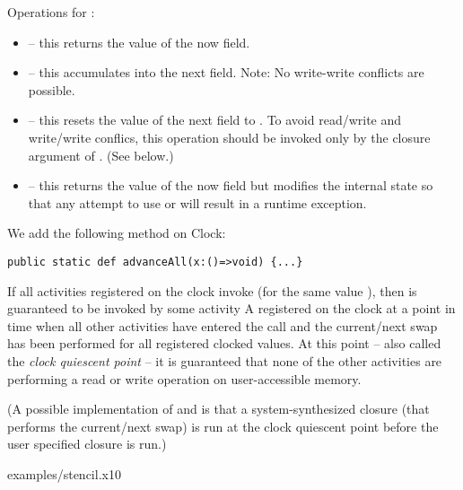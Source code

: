Operations for :
\begin{itemize}
\item {} -- this returns the value of the now field.
\item{} -- this accumulates  into the next field. Note: No
     write-write conflicts are possible.
\item{} -- this resets the value of the next field to . To avoid
     read/write and write/write conflics, this operation should be
     invoked only by the closure argument of
     . (See below.)
\item {} -- this returns the value of the now field but
     modifies the internal state so that any attempt to use  
     or  will result in a runtime exception.
\end{itemize}

We add the following method on Clock:
\begin{lstlisting}
public static def advanceAll(x:()=>void) {...}
\end{lstlisting}

If all activities registered on the clock invoke 
(for the same value ), then  is guaranteed to be
invoked by some activity A registered on the clock at a point in time
when all other activities have entered the  call
and the current/next swap has been performed for all registered
clocked values.  At this point -- also called the {\em clock quiescent
point} -- it is guaranteed that none of the other activities are
performing a read or write operation on user-accessible memory.

(A possible implementation of  and
 is that a system-synthesized closure (that
performs the current/next swap) is run at the clock quiescent point
before the user specified closure is run.)


 {examples/stencil.x10}
